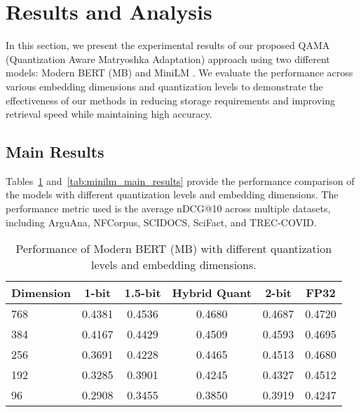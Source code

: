 \section{Results and Analysis}
\label{sec:results}

In this section, we present the experimental results of our proposed QAMA (Quantization Aware Matryoshka Adaptation) approach using two different models: Modern BERT (MB) \cite{modernbert, nussbaum2024nomic} and MiniLM \cite{minilm, reimers-2019-sentence-bert}. We evaluate the performance across various embedding dimensions and quantization levels to demonstrate the effectiveness of our methods in reducing storage requirements and improving retrieval speed while maintaining high accuracy.

\subsection{Main Results}

Tables~\ref{tab:mb_main_results} and~\ref{tab:minilm_main_results} provide the performance comparison of the models with different quantization levels and embedding dimensions. The performance metric used is the average nDCG@10 across multiple datasets, including ArguAna, NFCorpus, SCIDOCS, SciFact, and TREC-COVID.

\begin{table}[ht]
\caption{Performance of Modern BERT (MB) with different quantization levels and embedding dimensions.}
\label{tab:mb_main_results}
\centering
\begin{tabular}{lccccc}
\toprule
\textbf{Dimension} & \textbf{1-bit} & \textbf{1.5-bit} & \textbf{Hybrid Quant} & \textbf{2-bit} & \textbf{FP32} \\
\midrule
768 & 0.4381 & 0.4536 & 0.4680 & 0.4687 & 0.4720 \\
384 & 0.4167 & 0.4429 & 0.4509 & 0.4593 & 0.4695 \\
256 & 0.3691 & 0.4228 & 0.4465 & 0.4513 & 0.4680 \\
192 & 0.3285 & 0.3901 & 0.4245 & 0.4327 & 0.4512 \\
96 & 0.2908 & 0.3455 & 0.3850 & 0.3919 & 0.4247 \\
\bottomrule
\end{tabular}
\end{table}

